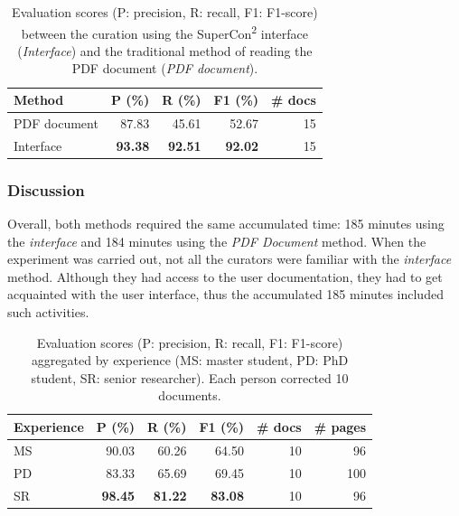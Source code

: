 \begin{table}[htpb]
\centering\small
\caption{Evaluation scores (P: precision, R: recall, F1: F1-score) between the curation using the SuperCon\textsuperscript{2} interface (\textit{Interface}) and the traditional method of reading the PDF document (\textit{PDF document}). }
\begin{tabular}{lrrrr}
\toprule
    \textbf{Method}    & \textbf{P (\%)}   & \textbf{R (\%)}   & \textbf{F1 (\%)}  & \textbf{\# docs}   \\
    \midrule
    PDF document    & 87.83             & 45.61             & 52.67             & 15        \\
    Interface       & \textbf{93.38}    & \textbf{92.51}    & \textbf{92.02}    & 15        \\
    \bottomrule
\end{tabular}
\label{tab:evaluation-interface-correction}
\end{table}


\subsubsection{Discussion}
Overall, both methods required the same accumulated time: 185 minutes using the \textit{interface} and 184 minutes using the \textit{PDF Document} method.
When the experiment was carried out, not all the curators were familiar with the \textit{interface} method. Although they had access to the user documentation, they had to get acquainted with the user interface, thus the accumulated 185 minutes included such activities. 

\begin{table}[htbp]
\centering
\caption{Evaluation scores (P: precision, R: recall, F1: F1-score) aggregated by experience (MS: master student, PD: PhD student, SR: senior researcher). Each person corrected 10 documents.}
\begin{tabular}{lrrrrr}
\toprule
\textbf{Experience} & \textbf{P (\%)}   & \textbf{R (\%)}   & \textbf{F1 (\%)}  & \textbf{\#  docs} & \textbf{\# pages}\\
\midrule
MS      & 90.03             & 60.26             & 64.50           & 10  & 96    \\
PD      & 83.33             & 65.69             & 69.45           & 10  & 100   \\
SR      & \textbf{98.45}    & \textbf{81.22}    & \textbf{83.08}  & 10  & 96  \\
\bottomrule
\end{tabular}
\label{tab:accuracy-by-experience}
\end{table}

